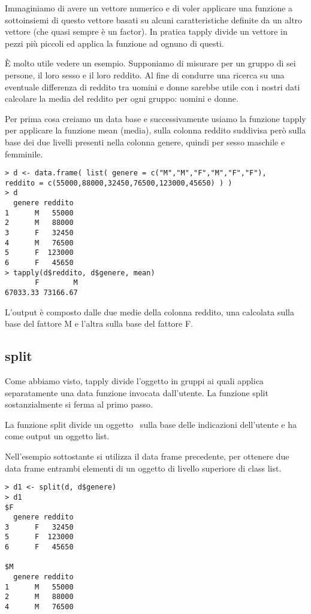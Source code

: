 Immaginiamo di avere un vettore numerico e di voler applicare una funzione a sottoinsiemi di questo vettore basati su alcuni caratteristiche definite da un altro vettore (che quasi sempre è un factor). In pratica \textsf{tapply} divide un vettore in pezzi più piccoli ed applica la funzione ad ognuno di questi.

È molto utile vedere un esempio. Supponiamo di misurare per un gruppo di sei persone, il loro sesso e il loro reddito. Al fine di condurre una ricerca su una eventuale differenza di reddito tra uomini e donne sarebbe utile con i nostri dati calcolare la media del reddito per ogni gruppo: uomini e donne.

Per prima cosa creiamo un data base e successivamente usiamo la funzione
\textsf{tapply} per applicare la funzione \textsf{mean} (media), sulla colonna reddito suddivisa però sulla base dei due livelli presenti nella colonna genere, quindi per sesso maschile e femminile.

\begin{lstlisting}
> d <- data.frame( list( genere = c("M","M","F","M","F","F"), 
reddito = c(55000,88000,32450,76500,123000,45650) ) )
> d
  genere reddito
1      M   55000
2      M   88000
3      F   32450
4      M   76500
5      F  123000
6      F   45650
> tapply(d$reddito, d$genere, mean)
       F        M 
67033.33 73166.67
\end{lstlisting}

L'output è composto dalle due medie della colonna reddito, una calcolata sulla base del fattore M e l'altra sulla base del fattore F.

\subsection{split}

Come abbiamo visto, \textsf{tapply} divide l'oggetto in gruppi ai quali applica separatamente una data funzione invocata dall'utente. La funzione \textsf{split} sostanzialmente si ferma al primo passo.

La funzione \textsf{split} divide un oggetto \erre\ sulla base delle indicazioni dell'utente e ha come output un oggetto list.

Nell'esempio sottostante si utilizza il data frame precedente, per ottenere due data frame entrambi elementi di un oggetto di livello superiore di class list.

\begin{lstlisting}	
> d1 <- split(d, d$genere)
> d1
$F
  genere reddito
3      F   32450
5      F  123000
6      F   45650

$M
  genere reddito
1      M   55000
2      M   88000
4      M   76500
\end{lstlisting}

